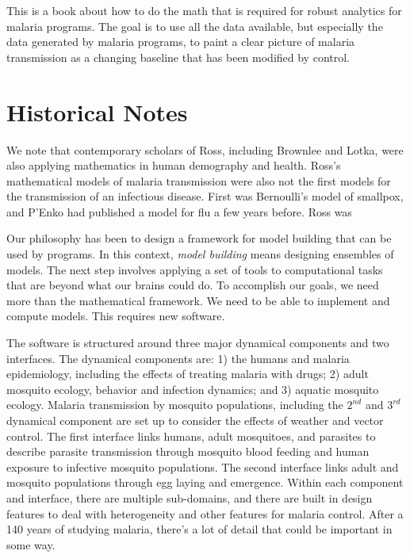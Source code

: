 \documentclass[
]{book}
\begin{document}
This is a book about how to do the math that is required for robust analytics for malaria programs. The goal is to use all the data available, but especially the data generated by malaria programs, to paint a clear picture of malaria transmission as a changing baseline that has been modified by control.

\section{Historical Notes}\label{historical-notes}

We note that contemporary scholars of Ross, including Brownlee and Lotka, were also applying mathematics in human demography and health.
Ross's mathematical models of malaria transmission were also not the first models for the transmission of an infectious disease.
First was Bernoulli's model of smallpox, and P'Enko had published a model for flu a few years before.
Ross was

Our philosophy has been to design a framework for model building that can be used by programs.
In this context, \emph{model building} means designing ensembles of models. The next step involves applying a set of tools to computational tasks that are beyond what our brains could do. To accomplish our goals, we need more than the mathematical framework. We need to be able to implement and compute models. This requires new software.

The software is structured around three major dynamical components and two interfaces. The dynamical components are: 1) the humans and malaria epidemiology, including the effects of treating malaria with drugs; 2) adult mosquito ecology, behavior and infection dynamics; and 3) aquatic mosquito ecology. Malaria transmission by mosquito populations, including the \(2^{nd}\) and \(3^{rd}\) dynamical component are set up to consider the effects of weather and vector control. The first interface links humans, adult mosquitoes, and parasites to describe parasite transmission through mosquito blood feeding and human exposure to infective mosquito populations. The second interface links adult and mosquito populations through egg laying and emergence. Within each component and interface, there are multiple sub-domains, and there are built in design features to deal with heterogeneity and other features for malaria control. After a 140 years of studying malaria, there's a lot of detail that could be important in some way.
\end{document}
